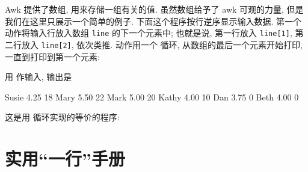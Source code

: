 Awk 提供了数组, 用来存储一组有关的值. 虽然数组给予了 awk 可观的力量, 但是
我们在这里只展示一个简单的例子. 下面这个程序按行逆序显示输入数据. 第一个
动作将输入行放入数组 \texttt{line} 的下一个元素中; 也就是说, 第一行放入
\texttt{line[1]}, 第二行放入 \texttt{line[2]}, 依次类推. \END 动作用一个
\while 循环, 从数组的最后一个元素开始打印, 一直到打印到第一个元素:
用  作输入, 输出是
\begin{file}
    Susie   4.25    18
    Mary    5.50    22
    Mark    5.00    20
    Kathy   4.00    10
    Dan     3.75    0
    Beth    4.00    0
\end{file}
这是用 \for 循环实现的等价的程序:

\section{实用``一行''手册}
\label{sec:a_handful_of_useful_one_liners}

